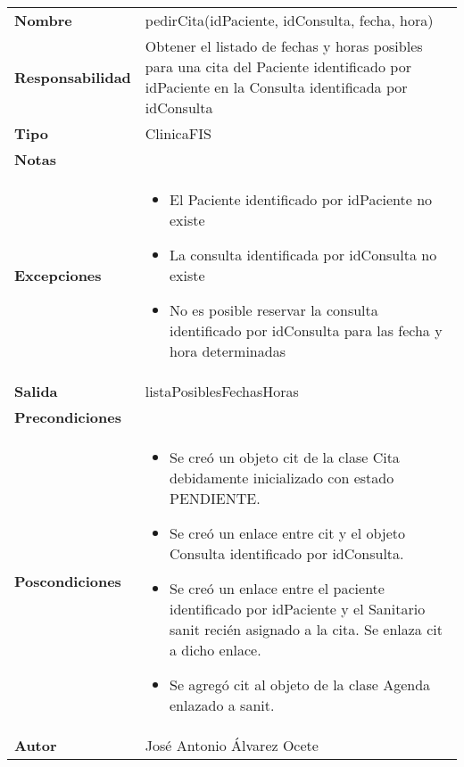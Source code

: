 \documentclass[11pt,a4paper]{article}
\newenvironment{itemizenomargins}
    {\begin{minipage}[t]{1\linewidth}\begin{itemize}}
    {\end{itemize}\end{minipage}}
\begin{document}
\begin{table}[H]
	\centering
	\label{my-label}
	\begin{tabularx}{\textwidth}{l|X}
		\textbf{Nombre}          & pedirCita(idPaciente, idConsulta, fecha, hora) \\
		\textbf{Responsabilidad} & Obtener el listado de fechas y horas posibles para una cita del Paciente identificado por idPaciente en la Consulta identificada por idConsulta \\
		\textbf{Tipo}            & ClinicaFIS \\
		\textbf{Notas}           &  \\
		\textbf{Excepciones}     & 
		\begin{itemizenomargins}
			\item El Paciente identificado por idPaciente no existe
			\item La consulta identificada por idConsulta no existe
			\item No es posible reservar la consulta identificado por idConsulta para las fecha y hora determinadas
		\end{itemizenomargins}\\
		\textbf{Salida}          &  listaPosiblesFechasHoras\\
		\textbf{Precondiciones}  & \\
		\textbf{Poscondiciones}  & 
		\begin{itemizenomargins}
			\item Se creó un objeto cit de la clase Cita debidamente inicializado con estado PENDIENTE.
			\item Se creó un enlace entre cit y el objeto Consulta identificado por idConsulta.
			\item Se creó un enlace entre el paciente identificado por idPaciente y el Sanitario sanit recién asignado a la cita. Se enlaza cit a dicho enlace.
			\item Se agregó cit al objeto de la clase Agenda enlazado a sanit.
		\end{itemizenomargins}\\
		\textbf{Autor}           & José Antonio Álvarez Ocete
	\end{tabularx}
\end{table}
\end{document}
